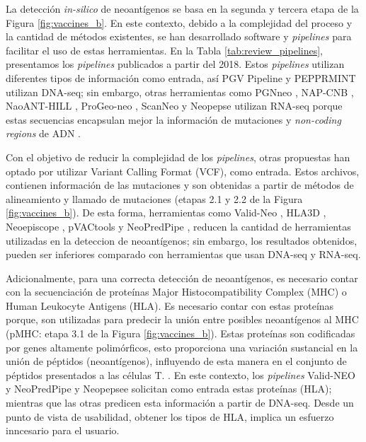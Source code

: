 \documentclass[a4paper]{article}
\begin{document}
	
La detección \textit{in-silico} de neoantígenos se basa en la segunda y tercera etapa de la Figura \ref{fig:vaccines_b}. En este contexto, debido a la complejidad del proceso y la cantidad de métodos existentes, se han desarrollado software y \textit{pipelines} para facilitar el uso de estas herramientas. En la Tabla \ref{tab:review_pipelines}, presentamos los \textit{pipelines} publicados a partir del 2018. Estos \textit{pipelines} utilizan diferentes tipos de información como entrada, así PGV Pipeline \citep{rubinsteyn2018computational} y PEPPRMINT \citep{zhou2023prioritizing} utilizan DNA-seq; sin embargo, otras herramientas como PGNneo \citep{tan2023pgnneo}, NAP-CNB \citep{wert2021predicting}, NaoANT-HILL \citep{coelho2020neoant}, ProGeo-neo \citep{li2020progeo}, ScanNeo \citep{wang2019scanneo} y Neopepse \citep{kim2018neopepsee} utilizan RNA-seq porque estas secuencias encapsulan mejor la información de mutaciones y \textit{non-coding regions} de ADN \citep{tan2023pgnneo}. 

Con el objetivo de reducir la complejidad de los \textit{pipelines}, otras propuestas han optado por utilizar Variant Calling Format (VCF), como entrada. Estos archivos, contienen información de las mutaciones y son obtenidas a partir de métodos de alineamiento y llamado de mutaciones (etapas 2.1 y 2.2 de la Figura \ref{fig:vaccines_b}). De esta forma, herramientas como Valid-Neo \citep{terai2022valid}, HLA3D \citep{li2022hla3d}, Neoepiscope \citep{wood2020neoepiscope} , pVACtools \citep{hundal2020pvactools} y NeoPredPipe \citep{schenck2019neopredpipe}, reducen la cantidad de herramientas utilizadas en la deteccion de neoantígenos; sin embargo, los resultados obtenidos, pueden ser inferiores comparado con herramientas que usan DNA-seq y RNA-seq.

Adicionalmente, para una correcta detección de neoantígenos, es necesario contar con la secuenciación de proteínas Major Histocompatibility Complex (MHC) o Human Leukocyte Antigens (HLA). Es necesario contar con estas proteínas porque, son utilizadas para predecir la unión entre posibles neoantígenos al MHC (pMHC: etapa 3.1 de la Figura \ref{fig:vaccines_b}). Estas proteínas son codificadas por genes altamente polimórficos, esto proporciona una variación sustancial en la unión de péptidos (neoantígenos), influyendo de esta manera en el conjunto de péptidos presentados a las células T. \citep{abualrous2021major}. En este contexto,  los \textit{pipelines} Valid-NEO \citep{terai2022valid}  y NeoPredPipe \citep{schenck2019neopredpipe} y Neopepsee \citep{kim2018neopepsee} solicitan como entrada estas proteínas (HLA); mientras que las otras predicen esta información a partir de DNA-seq. Desde un punto de vista de usabilidad, obtener los tipos de HLA, implica un esfuerzo inncesario para el usuario.
\end{document}
